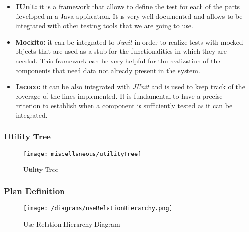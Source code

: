 		\begin{itemize}
			\item \textbf{JUnit:} it is a framework that allows to define the test for each of the parts developed in a Java application. It is very well documented and allows to be integrated with other testing tools that we are going to use.
			
			\item \textbf{Mockito:} it can be integrated to \emph{Junit} in order to realize tests with mocked objects that are used as a stub for the functionalities in which they are needed. This framework can be very helpful for the realization of the components that need data not already present in the system.
			
			\item \textbf{Jacoco:} it can be also integrated with \emph{JUnit} and is used to keep track of the coverage of the lines implemented. It is fundamental to have a precise criterion to establish when a component is sufficiently tested as it can be integrated.
		\end{itemize} 
		
	\subsubsection[Utility Tree]{\hyperlink{toc}{Utility Tree}}
		\label{sec:utilityTree}
		
		\begin{figure}[h!]
			\centering
			\texttt{[image: miscellaneous/utilityTree]}
			\caption{\label{fig:utilityTree} Utility Tree}
		\end{figure}
		
	\subsubsection[Plan Definition]{\hyperlink{toc}{Plan Definition}}
		\label{sec:planDefinition}
		
		\begin{figure}[h!]
			\centering
			\texttt{[image: /diagrams/useRelationHierarchy.png]}
			\caption{\label{fig:useRelationHierarchy} Use Relation Hierarchy Diagram}
		\end{figure}
	
